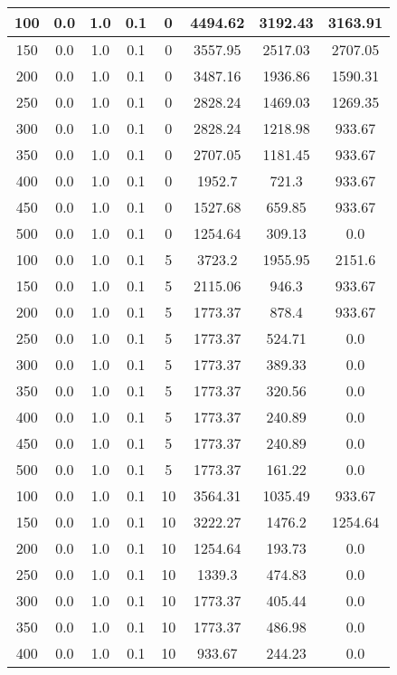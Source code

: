 \documentclass[a4paper, 12pt]{extreport}
\begin{document}
\begin{itemize}
\begin{longtable}{|c|c|c|c|c|c|c|c|}
			100 & 0.0 & 1.0 & 0.1 & 0 & 4494.62 & 3192.43 & 3163.91 \\\hline
			150 & 0.0 & 1.0 & 0.1 & 0 & 3557.95 & 2517.03 & 2707.05 \\\hline
			200 & 0.0 & 1.0 & 0.1 & 0 & 3487.16 & 1936.86 & 1590.31 \\\hline
			250 & 0.0 & 1.0 & 0.1 & 0 & 2828.24 & 1469.03 & 1269.35 \\\hline
			300 & 0.0 & 1.0 & 0.1 & 0 & 2828.24 & 1218.98 & 933.67 \\\hline
			350 & 0.0 & 1.0 & 0.1 & 0 & 2707.05 & 1181.45 & 933.67 \\\hline
			400 & 0.0 & 1.0 & 0.1 & 0 & 1952.7 & 721.3 & 933.67 \\\hline
			450 & 0.0 & 1.0 & 0.1 & 0 & 1527.68 & 659.85 & 933.67 \\\hline
			500 & 0.0 & 1.0 & 0.1 & 0 & 1254.64 & 309.13 & 0.0 \\\hline
			100 & 0.0 & 1.0 & 0.1 & 5 & 3723.2 & 1955.95 & 2151.6 \\\hline
			150 & 0.0 & 1.0 & 0.1 & 5 & 2115.06 & 946.3 & 933.67 \\\hline
			200 & 0.0 & 1.0 & 0.1 & 5 & 1773.37 & 878.4 & 933.67 \\\hline
			250 & 0.0 & 1.0 & 0.1 & 5 & 1773.37 & 524.71 & 0.0 \\\hline
			300 & 0.0 & 1.0 & 0.1 & 5 & 1773.37 & 389.33 & 0.0 \\\hline
			350 & 0.0 & 1.0 & 0.1 & 5 & 1773.37 & 320.56 & 0.0 \\\hline
			400 & 0.0 & 1.0 & 0.1 & 5 & 1773.37 & 240.89 & 0.0 \\\hline
			450 & 0.0 & 1.0 & 0.1 & 5 & 1773.37 & 240.89 & 0.0 \\\hline
			500 & 0.0 & 1.0 & 0.1 & 5 & 1773.37 & 161.22 & 0.0 \\\hline
			100 & 0.0 & 1.0 & 0.1 & 10 & 3564.31 & 1035.49 & 933.67 \\\hline
			150 & 0.0 & 1.0 & 0.1 & 10 & 3222.27 & 1476.2 & 1254.64 \\\hline
			200 & 0.0 & 1.0 & 0.1 & 10 & 1254.64 & 193.73 & 0.0 \\\hline
			250 & 0.0 & 1.0 & 0.1 & 10 & 1339.3 & 474.83 & 0.0 \\\hline
			300 & 0.0 & 1.0 & 0.1 & 10 & 1773.37 & 405.44 & 0.0 \\\hline
			350 & 0.0 & 1.0 & 0.1 & 10 & 1773.37 & 486.98 & 0.0 \\\hline
			400 & 0.0 & 1.0 & 0.1 & 10 & 933.67 & 244.23 & 0.0 \\\hline

\end{longtable}
\end{itemize}
\end{document}
